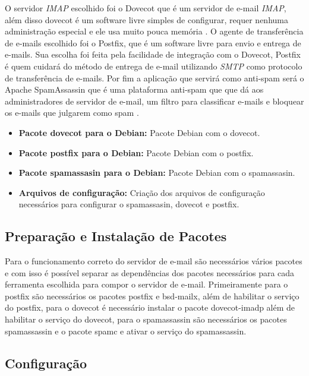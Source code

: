 O servidor \textit{IMAP} escolhido foi o Dovecot que é um servidor de e-mail
\textit{IMAP}, além disso dovecot é um software livre simples de configurar, requer nenhuma
administração especial e ele usa muito pouca memória \cite{dovecot}. O agente
de transferência de e-mails escolhido foi o Postfix, que é um software
livre para envio e entrega de e-mails. Sua escolha foi feita pela facilidade de
integração com o Dovecot, Postfix é quem cuidará do método de entrega de e-mail
utilizando \textit{SMTP} como protocolo de transferência de e-mails. Por fim a aplicação
que servirá como anti-spam será o Apache SpamAssassin que é uma plataforma anti-spam
que que dá aos administradores de servidor de e-mail, um filtro para classificar
 e-mails e bloquear os e-mails que julgarem como spam \cite{spam}.

\begin{itemize}
   \item \textbf{Pacote dovecot para o Debian:} Pacote Debian com o dovecot.
   \item \textbf{Pacote postfix para o Debian:} Pacote Debian com o postfix.
   \item \textbf{Pacote spamassasin para o Debian:} Pacote Debian com o spamassasin.
   \item \textbf{Arquivos de configuração:} Criação dos arquivos de configuração
   necessários para configurar o spamassasin, dovecot e postfix.
\end{itemize}

\subsection{Preparação e Instalação de Pacotes }

Para o funcionamento correto do servidor de e-mail são necessários vários pacotes
e com isso é possível separar as dependências dos pacotes necessários para cada ferramenta
escolhida para compor o servidor de e-mail. Primeiramente para o postfix são necessários
os pacotes postfix e bsd-mailx, além de habilitar o serviço do postfix, para o dovecot
é necessário instalar o pacote dovecot-imadp além de habilitar o serviço do dovecot,
para o spamassassin são necessários os pacotes spamassassin e o pacote spamc e ativar
o serviço do spamassassin.

\subsection{Configuração}

